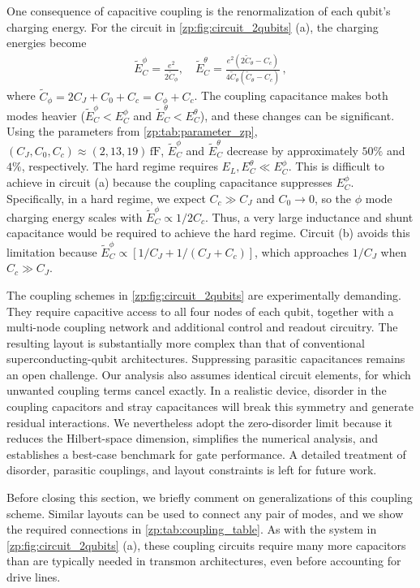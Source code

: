 One consequence of capacitive coupling is the renormalization of each qubit’s charging energy.
For the circuit in \cref{zp:fig:circuit_2qubits} (a), the charging energies become
 \begin{align}
    \tilde E_C^\phi = \frac{e^2}{2 \tilde C_\phi} , \quad
    \tilde E_C^\theta = \frac{e^2(2 \tilde C_\theta-C_c)}{4
\tilde C_{\theta}( \tilde C_{\theta} - C_c)}
     \, ,
 \end{align}
where $\tilde C_\phi = 2 C_J +C_0 +C_c = C_\phi +C_c$.
The coupling capacitance makes both modes heavier ($\tilde E_C^\phi < E_C^\phi$ and $\tilde E_C^\theta  < E_C^\theta$), and these changes can be significant.
Using the parameters from \cref{zp:tab:parameter_zp}, $(C_J,C_0,C_c)\approx(2,13,19)\,\mathrm{fF}$, $\tilde E_C^\phi$ and $\tilde E_C^\theta$ decrease by approximately $50\%$ and $4\%$, respectively.
The hard \zps regime requires $E_L,E_C^\theta\ll E_C^\phi$.
This is difficult to achieve in circuit (a) because the coupling capacitance suppresses $E_C^\phi$.
Specifically, in a hard \zps regime, we expect $C_c\gg C_J$ and $C_0 \rightarrow 0$, so the $\phi$ mode charging energy scales with $\tilde E_C^\phi\propto 1/2C_c$.
Thus, a very large inductance and shunt capacitance would be required to achieve the hard \zps regime.
Circuit (b) avoids this limitation because $\tilde E_C^\phi \propto \left[1/C_J+1/(C_J+C_c)\right]$, which approaches $1/C_J$ when $C_c\gg C_J$.

The coupling schemes in \cref{zp:fig:circuit_2qubits} are experimentally demanding.
They require capacitive access to all four nodes of each \zps qubit, together with a multi-node coupling network and additional control and readout circuitry.
The resulting layout is substantially more complex than that of conventional superconducting-qubit architectures.
Suppressing parasitic capacitances remains an open challenge.
Our analysis also assumes identical circuit elements, for which unwanted coupling terms cancel exactly.
In a realistic device, disorder in the coupling capacitors and stray capacitances will break this symmetry and generate residual interactions.
We nevertheless adopt the zero-disorder limit because it reduces the Hilbert-space dimension, simplifies the numerical analysis, and establishes a best-case benchmark for gate performance.
A detailed treatment of disorder, parasitic couplings, and layout constraints is left for future work.

Before closing this section, we briefly comment on generalizations of this coupling scheme.
Similar layouts can be used to connect any pair of \zps modes, and we show the required connections in \cref{zp:tab:coupling_table}.
As with the system in \cref{zp:fig:circuit_2qubits} (a), these coupling circuits require many more capacitors than are typically needed in transmon architectures, even before accounting for drive lines.

